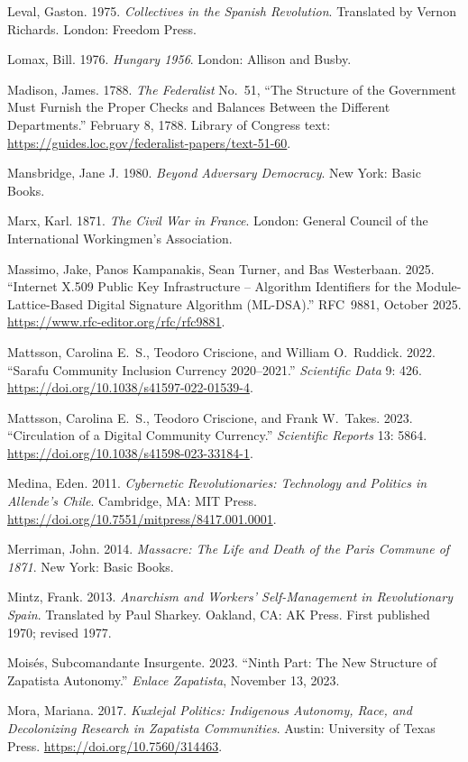 \documentclass[10pt,twoside,openany]{book}
\theoremstyle{dpepstyle}
\begin{document}
\begin{list}{}{\setlength{\leftmargin}{1.8em}\setlength{\itemindent}{-1.8em}\setlength{\itemsep}{3pt}\setlength{\parsep}{0pt}}
\item Leval, Gaston. 1975. \emph{Collectives in the Spanish Revolution}. Translated by Vernon Richards. London: Freedom Press.
\item Lomax, Bill. 1976. \emph{Hungary 1956}. London: Allison and Busby.
\item Madison, James. 1788. \emph{The Federalist} No.~51, ``The Structure of the Government Must Furnish the Proper Checks and Balances Between the Different Departments.'' February 8, 1788. Library of Congress text: \url{https://guides.loc.gov/federalist-papers/text-51-60}.
\item Mansbridge, Jane J. 1980. \emph{Beyond Adversary Democracy}. New York: Basic Books.
\item Marx, Karl. 1871. \emph{The Civil War in France}. London: General Council of the International Workingmen's Association.
\item Massimo, Jake, Panos Kampanakis, Sean Turner, and Bas Westerbaan. 2025. ``Internet X.509 Public Key Infrastructure -- Algorithm Identifiers for the Module-Lattice-Based Digital Signature Algorithm (ML-DSA).'' RFC~9881, October 2025. \url{https://www.rfc-editor.org/rfc/rfc9881}.
\item Mattsson, Carolina E.\ S., Teodoro Criscione, and William O.\ Ruddick. 2022. ``Sarafu Community Inclusion Currency 2020--2021.'' \emph{Scientific Data} 9: 426. \url{https://doi.org/10.1038/s41597-022-01539-4}.
\item Mattsson, Carolina E.\ S., Teodoro Criscione, and Frank W.\ Takes. 2023. ``Circulation of a Digital Community Currency.'' \emph{Scientific Reports} 13: 5864. \url{https://doi.org/10.1038/s41598-023-33184-1}.
\item Medina, Eden. 2011. \emph{Cybernetic Revolutionaries: Technology and Politics in Allende's Chile}. Cambridge, MA: MIT Press. \url{https://doi.org/10.7551/mitpress/8417.001.0001}.
\item Merriman, John. 2014. \emph{Massacre: The Life and Death of the Paris Commune of 1871}. New York: Basic Books.
\item Mintz, Frank. 2013. \emph{Anarchism and Workers' Self-Management in Revolutionary Spain}. Translated by Paul Sharkey. Oakland, CA: AK Press. First published 1970; revised 1977.
\item Mois\'es, Subcomandante Insurgente. 2023. ``Ninth Part: The New Structure of Zapatista Autonomy.'' \emph{Enlace Zapatista}, November 13, 2023.
\item Mora, Mariana. 2017. \emph{Kuxlejal Politics: Indigenous Autonomy, Race, and Decolonizing Research in Zapatista Communities}. Austin: University of Texas Press. \url{https://doi.org/10.7560/314463}.

\end{list}
\end{document}
